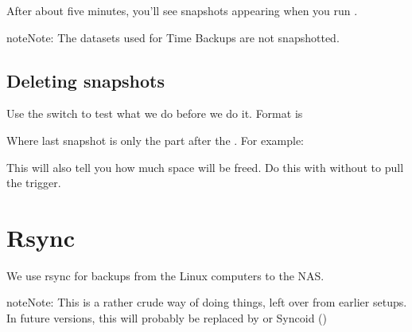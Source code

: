 \documentclass[a4paper,10pt,english]{sphinxmanual}
\begin{document}
After about five minutes, you’ll see snapshots appearing when you run .

\begin{sphinxadmonition}{note}{Note:}
The datasets used for Time Backups are not snapshotted.
\end{sphinxadmonition}


\section{Deleting snapshots}
\label{\detokenize{snapshots:deleting-snapshots}}
Use the  switch to test what we do before we do it. Format is

\begin{sphinxVerbatim}[commandchars=\\\{\}]
   
\end{sphinxVerbatim}

Where last snapshot is only the part after the . For example:

\begin{sphinxVerbatim}[commandchars=\\\{\}]
   
\end{sphinxVerbatim}

This will also tell you how much space will be freed. Do this with without
 to pull the trigger.


\chapter{Rsync}
\label{\detokenize{rsync:rsync}}\label{\detokenize{rsync::doc}}
We use rsync for backups from the Linux computers to the NAS.

\begin{sphinxadmonition}{note}{Note:}
This is a rather crude way of doing things, left over from earlier
setups. In future versions, this will probably be replaced by  or Syncoid ()
\end{sphinxadmonition}
\end{document}
